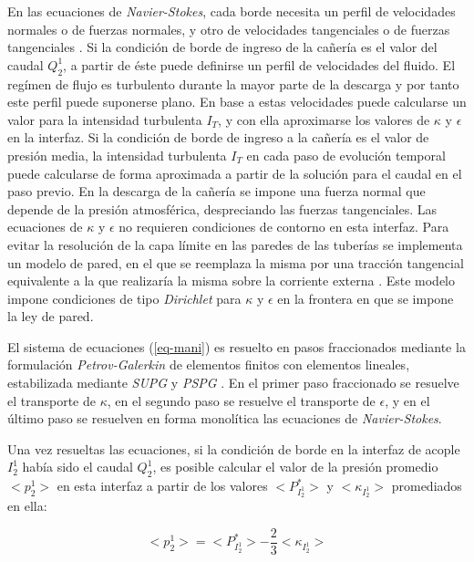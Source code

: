 En las ecuaciones de \textit{Navier-Stokes}, cada borde necesita un perfil de velocidades normales o de fuerzas normales,
y otro de velocidades tangenciales o de fuerzas tangenciales \cite{gunzburger}.
Si la condición de borde de ingreso de la cañería es el valor del caudal $Q_2^1$,
a partir de éste puede definirse un perfil de velocidades del fluido.
El regímen de flujo es turbulento durante la mayor parte de la descarga y por tanto este perfil puede suponerse plano.
En base a estas velocidades puede calcularse un valor para la intensidad turbulenta $I_T$,
y con ella aproximarse los valores de $\kappa$ y $\epsilon$ en la interfaz.
Si la condición de borde de ingreso a la cañería es el valor de presión media,
la intensidad turbulenta $I_T$ en cada paso de evolución temporal puede calcularse de forma aproximada a partir de la solución para el caudal en el paso previo.
En la descarga de la cañería se impone una fuerza normal que depende de la presión atmosférica,
despreciando las fuerzas tangenciales.
Las ecuaciones de $\kappa$ y $\epsilon$ no requieren condiciones de contorno en esta interfaz.
Para evitar la resolución de la capa límite en las paredes de las tuberías se implementa un modelo de pared,
en el que se reemplaza la misma por una tracción tangencial equivalente a la que realizaría la misma sobre la corriente externa
\cite{k-e}.
Este modelo impone condiciones de tipo \textit{Dirichlet} para $\kappa$ y $\epsilon$ en la frontera en que se impone la ley de pared.

El sistema de ecuaciones (\ref{eq-mani}) es resuelto en pasos fraccionados \cite{lew} mediante la formulación \textit{Petrov-Galerkin} \cite{galerkin} de elementos finitos con elementos lineales, 
estabilizada mediante \textit{SUPG} \cite{supg} y \textit{PSPG} \cite{pspg}.
En el primer paso fraccionado se resuelve el transporte de $\kappa$,
en el segundo paso se resuelve el transporte de $\epsilon$,
y en el último paso se resuelven en forma monolítica las ecuaciones de \textit{Navier-Stokes}.

Una vez resueltas las ecuaciones,
si la condición de borde en la interfaz de acople $I_2^1$ había sido el caudal $Q_2^1$,
es posible calcular el valor de la presión promedio $<p_2^1>$ en esta interfaz
a partir de los valores $<P^*_{I_2^1}>$ y $<\kappa_{I_2^1}>$ promediados en ella:

\begin{equation}
<p_2^1> = <P^*_{I_2^1}> - \frac {2}{3} <\kappa_{I_2^1}>
\end{equation}

